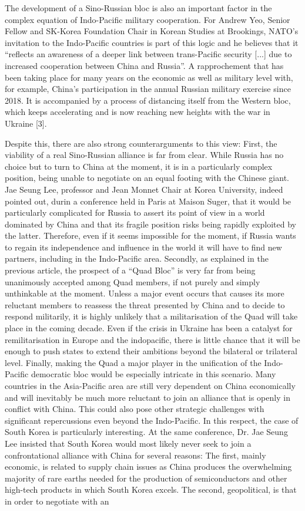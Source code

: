 \documentclass[11pt,a4paper]{article}
\begin{document}
The development of a Sino-Russian bloc is also an important factor in the complex equation of Indo-Pacific military cooperation. For Andrew Yeo, Senior Fellow and SK-Korea Foundation Chair in Korean Studies at Brookings, NATO’s invitation to the Indo-Pacific countries is part of this logic and he believes that it “reflects an awareness of a deeper link between trans-Pacific security [...] due to increased cooperation between China and Russia”. A rapprochement that has been taking place for many years on the economic as well as military level with, for example, China’s participation in the annual Russian military exercise since 2018. It is accompanied by a process of distancing itself from the Western bloc, which keeps accelerating and is now reaching new heights with the war in Ukraine {[}3{]}.

Despite this, there are also strong counterarguments to this view: First, the viability of a real Sino-Russian alliance is far from clear. While Russia has no choice but to turn to China at the moment, it is in a particularly complex position, being unable to negotiate on an equal footing with the Chinese giant. Jae Seung Lee, professor and Jean Monnet Chair at Korea University, indeed pointed out, durin a conference held in Paris at Maison Suger, that it would be particularly complicated for Russia to assert its point of view in a world dominated by China and that its fragile position risks being rapidly exploited by the latter. Therefore, even if it seems impossible for the moment, if Russia wants to regain its independence and influence in the world it will have to find new partners, including in the Indo-Pacific area. Secondly, as explained in the previous article, the prospect of a “Quad Bloc” is very far from being unanimously accepted among Quad members, if not purely and simply unthinkable at the moment. Unless a major event occurs that causes its more reluctant members to reassess the threat presented by China and to decide to respond militarily, it is highly unlikely that a militarisation of the Quad will take place in the coming decade. Even if the crisis in Ukraine has been a catalyst for remilitarisation in Europe and the indopacific, there is little chance that it will be enough to push states to extend their ambitions beyond the bilateral or trilateral level. Finally, making the Quad a major player in the unification of the Indo-Pacific democratic bloc would be especially intricate in this scenario. Many countries in the Asia-Pacific area are still very dependent on China economically and will inevitably be much more reluctant to join an alliance that is openly in conflict with China. This could also pose other strategic challenges with significant repercussions even beyond the Indo-Pacific. In this respect, the case of South Korea is particularly interesting. At the same conference, Dr. Jae Seung Lee insisted that South Korea would most likely never seek to join a confrontational alliance with China for several reasons: The first, mainly economic, is related to supply chain issues as China produces the overwhelming majority of rare earths needed for the production of semiconductors and other high-tech products in which South Korea excels. The second, geopolitical, is that in order to negotiate with an 
\end{document}
